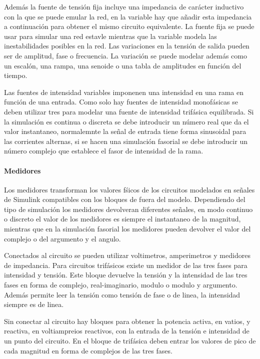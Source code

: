 \documentclass{book}
\begin{document}
Adem\'as la fuente de tensi\'on fija incluye una impedancia de car\'acter inductivo con la que se puede emular la red, en la variable hay que añadir esta impedancia a continuaci\'on para obtener el mismo circuito equivalente. La fuente fija se puede usar para simular una red estavle mientras que la variable modela las inestabilidades posibles en la red. Las variaciones en la tensi\'on de salida pueden ser de amplitud, fase o frecuencia. La variaci\'on se puede modelar adem\'as como un escal\'on, una rampa, una senoide o una tabla de amplitudes en funci\'on del tiempo. \par

Las fuentes de intensidad variables imponenen una intensidad en una rama en funci\'on de una entrada. Como solo hay fuentes de intensidad monof\'asicas se deben utilizar tres para modelar una fuente de intensidad trif\'asica equilibrada. Si la simulaci\'on es continua o discreta se debe introducir un n\'umero real que da el valor instantaneo, normalemnte la señal de entrada tiene forma sinusoidal para las corrientes alternas, si se hacen una simulaci\'on fasorial se debe introducir un n\'umero complejo que establece el fasor de intensidad de la rama. \par

		\paragraph {Medidores}
Los medidores transforman los valores f\'sicos de los circuitos modelados en señales de Simulink compatibles con los bloques de fuera del modelo. Dependiendo del tipo de simulaci\'on los medidores devolveran diferentes señales, en modo continuo o discreto el valor de los medidores es siempre el instantaneo de la magnitud, mientras que en la simulaci\'on fasorial los medidores pueden devolver el valor del complejo o del argumento y el angulo. \par

Conectados al circuito se pueden utilizar voltimetros, amperimetros y medidores de impedancia. Para circuitos trif\'asicos existe un medidor de las tres fases para intensidad y tensi\'on. Este bloque devuelve la tensi\'on y la intensidad de las tres fases en forma de complejo, real-imaginario, modulo o modulo y argumento. Adem\'as permite leer la tensi\'on como tensi\'on de fase o de linea, la intensidad siempre es de linea. \par

Sin conectar al circuito hay bloques para obtener la potencia activa, en vatios, y reactiva, en voltiampreios reactivos, con la entrada de la tensi\'on e intensidad de un punto del circuito. En el bloque de trif\'asica deben entrar los valores de pico de cada magnitud en forma de complejos de las tres fases. \par
 
\end{document}
